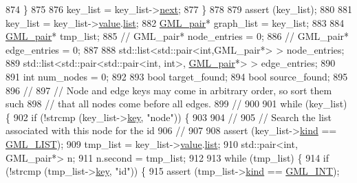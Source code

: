 \begin{DoxyCode}
874     \}
875     
876     key\_list = key\_list->\mbox{\hyperlink{struct_g_m_l__pair_aef47e6103f05e1411fa55f731972b592}{next}};
877     \}
878 
879     assert (key\_list);
880 
881     key\_list = key\_list->\mbox{\hyperlink{struct_g_m_l__pair_aef8797e7d2fc0d2e2f628ce9c2783a6c}{value}}.\mbox{\hyperlink{union_g_m_l__pair__val_ad9d038864154789007178fbf4d43ec9d}{list}};
882     \mbox{\hyperlink{struct_g_m_l__pair}{GML\_pair}}* graph\_list = key\_list;
883 
884     \mbox{\hyperlink{struct_g_m_l__pair}{GML\_pair}}* tmp\_list;
885     \textcolor{comment}{// GML\_pair* node\_entries = 0;}
886     \textcolor{comment}{// GML\_pair* edge\_entries = 0;}
887     
888     std::list<std::pair<int,GML\_pair*> > node\_entries;
889     std::list<std::pair<std::pair<int, int>, \mbox{\hyperlink{struct_g_m_l__pair}{GML\_pair}}*> > edge\_entries;
890     
891     \textcolor{keywordtype}{int} num\_nodes = 0; 
892 
893     \textcolor{keywordtype}{bool} target\_found;
894     \textcolor{keywordtype}{bool} source\_found;
895 
896     \textcolor{comment}{//}
897     \textcolor{comment}{// Node and edge keys may come in arbitrary order, so sort them such}
898     \textcolor{comment}{// that all nodes come before all edges.}
899     \textcolor{comment}{//}
900     
901     \textcolor{keywordflow}{while} (key\_list) \{
902     \textcolor{keywordflow}{if} (!strcmp (key\_list->\mbox{\hyperlink{struct_g_m_l__pair_a00e5de36c09fef63b8d439b4341f0655}{key}}, \textcolor{stringliteral}{"node"})) \{
903 
904         \textcolor{comment}{//}
905         \textcolor{comment}{// Search the list associated with this node for the id}
906         \textcolor{comment}{//}
907 
908         assert (key\_list->\mbox{\hyperlink{struct_g_m_l__pair_ab63f19fdd3fc40bfaba08d3af1a927d8}{kind}} == \mbox{\hyperlink{gml__scanner_8h_a2dc4839311e05f9a17adefcd0012b77fa0f6c57e598f6d261bd378b1f21d22172}{GML\_LIST}});
909         tmp\_list = key\_list->\mbox{\hyperlink{struct_g_m_l__pair_aef8797e7d2fc0d2e2f628ce9c2783a6c}{value}}.\mbox{\hyperlink{union_g_m_l__pair__val_ad9d038864154789007178fbf4d43ec9d}{list}};
910         std::pair<int, GML\_pair*> n;
911         n.second = tmp\_list;
912 
913         \textcolor{keywordflow}{while} (tmp\_list) \{
914         \textcolor{keywordflow}{if} (!strcmp (tmp\_list->\mbox{\hyperlink{struct_g_m_l__pair_a00e5de36c09fef63b8d439b4341f0655}{key}}, \textcolor{stringliteral}{"id"})) \{
915             assert (tmp\_list->\mbox{\hyperlink{struct_g_m_l__pair_ab63f19fdd3fc40bfaba08d3af1a927d8}{kind}} == \mbox{\hyperlink{gml__scanner_8h_a2dc4839311e05f9a17adefcd0012b77fa9c67cc9c0b45542b05cfe2097996541d}{GML\_INT}});

\end{DoxyCode}
